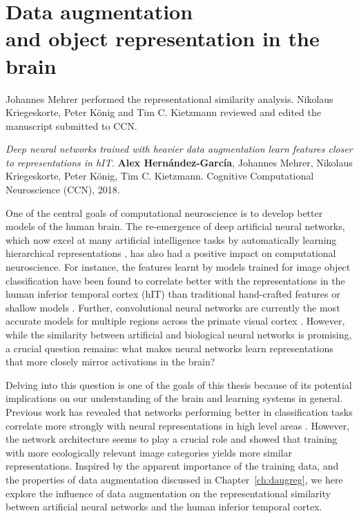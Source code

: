 {
\chapter[Data augmentation and object representation in the brain]{Data augmentation\\and object representation in the brain}
\label{ch:daugit}
\renewcommand{\chapterpath}{includes/daug-it}
%
\begin{contributors}
    Johannes Mehrer performed the representational similarity analysis. Nikolaus Kriegeskorte, Peter K{\"onig} and Tim C. Kietzmann reviewed and edited the manuscript submitted to CCN.
\end{contributors}
%
\begin{outreach}
    \item \textit{Deep neural networks trained with heavier data augmentation learn features closer to representations in hIT.} \textbf{Alex Hern{\'a}ndez-Garc{\'i}a}, Johannes Mehrer, Nikolaus Kriegeskorte, Peter K{\"o}nig, Tim C. Kietzmann. Cognitive Computational Neuroscience (CCN), 2018. 
\end{outreach}
%
One of the central goals of computational neuroscience is to develop better models of the human brain. The re-emergence of deep artificial neural networks, which now excel at many artificial intelligence tasks by automatically learning hierarchical representations \citep{girshick2014dlhierarchy}, has also had a positive impact on computational neuroscience. For instance, the features learnt by models trained for image object classification have been found to correlate better with the representations in the human inferior temporal cortex (hIT) than  traditional hand-crafted features or shallow models \citep{khaligh2014annbrains, yamins2014annsbrains, gucclu2015annbrains}. Further, convolutional neural networks are currently the most accurate models for multiple regions across the primate visual cortex \citep{kietzmann2019dnncompneuro, yamins2016computneuro}. However, while the similarity between artificial and biological neural networks is promising, a crucial question remains: what makes neural networks learn representations that more closely mirror activations in the brain?

Delving into this question is one of the goals of this thesis because of its potential implications on our understanding of the brain and learning systems in general. Previous work has revealed that networks performing better in classification tasks correlate more strongly with neural representations in high level areas \citep{yamins2014annsbrains}. However, the network architecture seems to play a crucial role \citep{storrs2017ccn} and \citet{mehrer2017ccn} showed that training with more ecologically relevant image categories yields more similar representations. Inspired by the apparent importance of the training data, and the properties of data augmentation discussed in Chapter~\ref{ch:daugreg}, we here explore the influence of data augmentation on the representational similarity between artificial neural networks and the human inferior temporal cortex.

}
